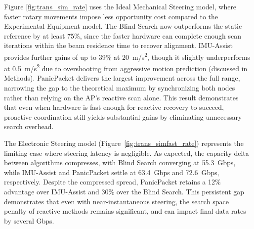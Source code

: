 \documentclass[fleqn,10pt]{wlscirep}
\begin{document}
Figure \ref{fig:trans_sim_rate} uses the Ideal Mechanical Steering model, where faster rotary movements impose less opportunity cost compared to the Experimental Equipment model. The Blind Search now outperforms the static reference by at least 75\%, since the faster hardware can complete enough scan iterations within the beam residence time to recover alignment. IMU-Assist provides further gains of up to 39\% at \SI{20}{m/s^2}, though it slightly underperforms at \SI{0.5}{m/s^2} due to overshooting from aggressive motion prediction (discussed in Methods). PanicPacket delivers the largest improvement across the full range, narrowing the gap to the theoretical maximum by synchronizing both nodes rather than relying on the AP's reactive scan alone. This result demonstrates that even when hardware is fast enough for reactive recovery to succeed, proactive coordination still yields substantial gains by eliminating unnecessary search overhead.


The Electronic Steering model (Figure~\ref{fig:trans_simfast_rate}) represents the limiting case where steering latency is negligible. As expected, the capacity delta between algorithms compresses, with Blind Search converging at \SI{55.3}{Gbps}, while IMU-Assist and PanicPacket settle at \SI{63.4}{Gbps} and \SI{72.6}{Gbps}, respectively. Despite the compressed spread, PanicPacket retains a 12\% advantage over IMU-Assist and 30\% over the Blind Search. This persistent gap demonstrates that even with near-instantaneous steering, the search space penalty of reactive methods remains significant, and can impact final data rates by several Gbps.
\end{document}

